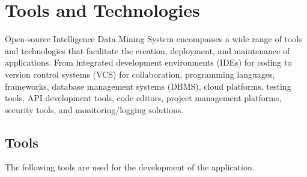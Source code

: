 \chapter{Tools and Technologies}\label{ch:tools-and-technologies}

\justify
Open-source Intelligence Data Mining System encompasses a wide range of tools and technologies that facilitate the creation, deployment, and maintenance of applications.
From integrated development environments (IDEs) for coding to version control systems (VCS) for collaboration, programming languages, frameworks, database management systems (DBMS), cloud platforms, testing tools, API development tools, code editors, project management platforms, security tools, and monitoring/logging solutions.

\section{Tools}\label{sec:tools}
\justify

The following tools are used for the development of the application.

